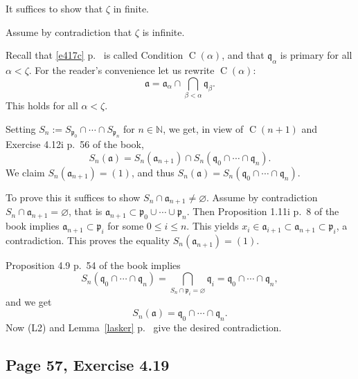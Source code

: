 \documentclass[parskip=half,fontsize=12pt]{scrartcl}%
\newcommand{\oo}{\operatorname}\newcommand{\ooo}{\operatorname*}
\newcommand{\mf}{\mathfrak}
\newcommand{\aaa}{\mf a}
\newcommand{\bbb}{\mf b}
\newcommand{\ppp}{\mf p}
\newcommand{\qqq}{\mf q}
\begin{document}
It suffices to show that $\zeta$ in finite. 

Assume by contradiction that $\zeta$ is infinite.

Recall that \eqref{e417c} p.~\pageref{e417c} is called Condition $\oo C(\alpha)$, and that $\qqq_\alpha$ is primary for all $\alpha<\zeta$. For the reader's convenience let us rewrite $\oo C(\alpha)$:
$$
\aaa=\aaa_\alpha\cap\bigcap_{\beta<\alpha}\qqq_\beta.
$$ 
This holds for all $\alpha<\zeta$.

Setting $S_n:=S_{\ppp_0}\cap\cdots\cap S_{\ppp_n}$ for $n\in\mathbb N$, we get, in view of $\oo C(n+1)$ and Exercise 4.12i p.~56 of the book,
$$
S_n(\aaa)=S_n(\aaa_{n+1})\cap S_n(\qqq_0\cap\cdots\cap\qqq_n).
$$ 
We claim $S_n(\aaa_{n+1})=(1)$, and thus $S_n(\aaa)=S_n(\qqq_0\cap\cdots\cap\qqq_n)$.

To prove this it suffices to show $S_n\cap\aaa_{n+1}\ne\varnothing$. Assume by contradiction $S_n\cap\aaa_{n+1}=\varnothing$, that is $\aaa_{n+1}\subset\ppp_0\cup\cdots\cup\ppp_n$. Then Proposition 1.11i p.~8 of the book implies $\aaa_{n+1}\subset\ppp_i$ for some $0\le i\le n$. This yields $x_i\in\aaa_{i+1}\subset\aaa_{n+1}\subset\ppp_i$, a contradiction. This proves the equality $S_n(\aaa_{n+1})=(1)$.

Proposition 4.9 p.~54 of the book implies 
$$
S_n(\qqq_0\cap\cdots\cap\qqq_n)=\bigcap_{S_n\cap\ppp_i=\varnothing}\qqq_i=\qqq_0\cap\cdots\cap\qqq_n,
$$ 
and we get
$$
S_n(\aaa)=\qqq_0\cap\cdots\cap\qqq_n.
$$ 
Now (L2) and Lemma~\ref{lasker} p.~\pageref{lasker} give the desired contradiction.

\subsection{Page 57, Exercise 4.19}%
\end{document}
